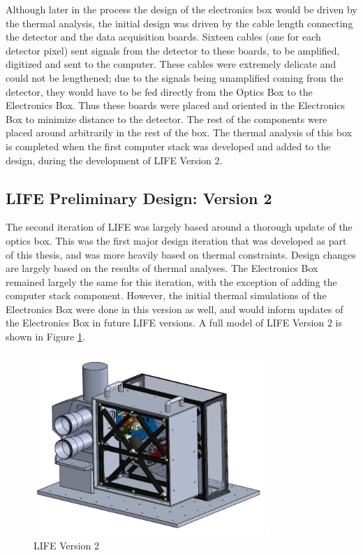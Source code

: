 Although later in the process the design of the electronics box would be driven by the thermal analysis, the initial design was driven by the cable length connecting the detector and the data acquisition boards. Sixteen cables (one for each detector pixel) sent signals from the detector to these boards, to be amplified, digitized and sent to the computer. These cables were extremely delicate and could not be lengthened; due to the signals being unamplified coming from the detector, they would have to be fed directly from the Optics Box to the Electronics Box. Thus these boards were placed and oriented in the Electronics Box to minimize distance to the detector. The rest of the components were placed around arbitrarily in the rest of the box. The thermal analysis of this box is completed when the first computer stack was developed and added to the design, during the development of LIFE Version 2.

\subsection{LIFE Preliminary Design: Version 2}
The second iteration of LIFE was largely based around a thorough update of the optics box. This was the first major design iteration that was developed as part of this thesis, and was more heavily based on thermal constraints. Design changes are largely based on the results of thermal analyses. The Electronics Box remained largely the same for this iteration, with the exception of adding the computer stack component. However, the initial thermal simulations of the Electronics Box were done in this version as well, and would inform updates of the Electronics Box in future LIFE versions. A full model of LIFE Version 2 is shown in Figure \ref{fig:LIFE_V2}.

\begin{figure} %
    \centering
    \includegraphics[width=0.8\textwidth]{chap3_images/LIFE_V2_images/LIFE_V2.png}
    \caption{LIFE Version 2}
    \label{fig:LIFE_V2}
\end{figure}

